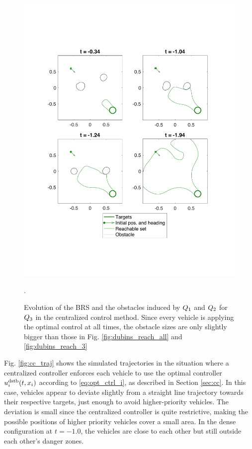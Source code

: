 \begin{figure}[H]
  \centering
  \includegraphics[width=\columnwidth]{"fig/cc_rs3"}
  \caption{Evolution of the BRS and the obstacles induced by $Q_1$ and $Q_2$ for $Q_3$ in the centralized control method. Since every vehicle is applying the optimal control at all times, the obstacle sizes are only slightly bigger than those in Fig. \ref{fig:dubins_reach_all} and \ref{fig:dubins_reach_3}}.
  \label{fig:cc_rs3}
\end{figure}

Fig. \ref{fig:cc_traj} shows the simulated trajectories in the situation where a centralized controller enforces each vehicle to use the optimal controller $u^\text{dstb}_i(t, x_i)$ according to \eqref{eq:opt_ctrl_i}, as described in Section \ref{sec:cc}. In this case, vehicles appear to deviate slightly from a straight line trajectory towards their respective targets, just enough to avoid higher-priority vehicles. The deviation is small since the centralized controller is quite restrictive, making the possible positions of higher priority vehicles cover a small area. In the dense configuration at $t=-1.0$, the vehicles are close to each other but still outside each other's danger zones.

